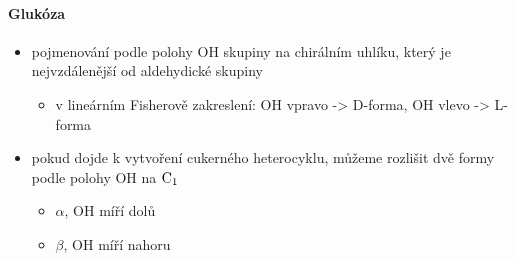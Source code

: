 \documentclass[DIV=8]{scrreprt}
\begin{document}
\paragraph{Glukóza}
\begin{itemize}[nosep]
    \item pojmenování podle polohy OH skupiny na chirálním uhlíku, který je nejvzdálenější od aldehydické skupiny
\begin{itemize}[nosep]
    \item v lineárním Fisherově zakreslení: OH vpravo -> D-forma, OH vlevo -> L-forma
\end{itemize}

    \item pokud dojde k vytvoření cukerného heterocyklu, můžeme rozlišit dvě formy podle polohy OH na \(\ce{C1}\)
\begin{itemize}[nosep]
    \item \(\alpha\), OH míří dolů
    \item \(\beta\), OH míří nahoru
\end{itemize}

\end{itemize}
\end{document}
